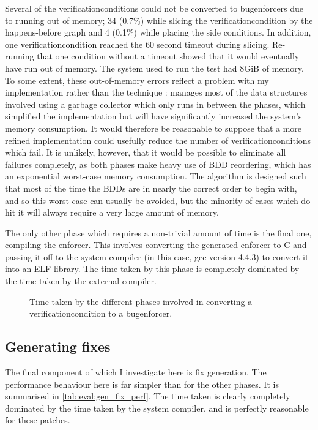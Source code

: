 Several of the \glspl{verificationcondition} could not be converted to
\glspl{bugenforcer} due to running out of memory; 34 (0.7\%) while
slicing the \gls{verificationcondition} by the happens-before graph
and 4 (0.1\%) while placing the side conditions.  In addition, one
\gls{verificationcondition} reached the 60 second timeout during
slicing.  Re-running that one condition without a timeout showed that
it would eventually have run out of memory.  The system used to run
the test had 8GiB of memory.  To some extent, these out-of-memory
errors reflect a problem with my implementation {\implementation}
rather than the technique {\technique}: {\implementation} manages most
of the data structures involved using a garbage collector which only
runs in between the phases, which simplified the implementation but
will have significantly increased the system's memory consumption.  It
would therefore be reasonable to suppose that a more refined
implementation could usefully reduce the number of
\glspl{verificationcondition} which fail.  It is unlikely, however,
that it would be possible to eliminate all failures completely, as
both phases make heavy use of BDD reordering, which has an exponential
worst-case memory consumption.  The algorithm is designed such that
most of the time the BDDs are in nearly the correct order to begin
with, and so this worst case can usually be avoided, but the minority
of cases which do hit it will always require a very large amount of
memory.

The only other phase which requires a non-trivial amount of time is
the final one, compiling the enforcer.  This involves converting the
generated enforcer to C and passing it off to the system compiler (in
this case, gcc version 4.4.3) to convert it into an ELF library.  The
time taken by this phase is completely dominated by the time taken by
the external compiler.

\begin{figure}
  
  \caption{Time taken by the different phases involved in converting a
    \gls{verificationcondition} to a \gls{bugenforcer}.}
  \label{fig:eval:time_breakdown:convert_to_enforcer}
\end{figure}

\subsection{Generating fixes}
\label{sect:eval:genfix}

The final component of {\technique} which I investigate here is fix
generation.  The performance behaviour here is far simpler than for
the other phases.  It is summarised in
\autoref{tab:eval:gen_fix_perf}.  The time taken is clearly completely
dominated by the time taken by the system compiler, and is perfectly
reasonable for these patches.

